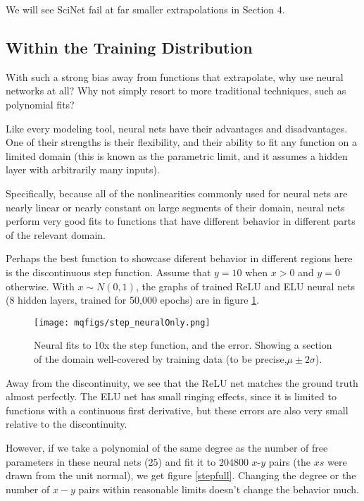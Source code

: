 \documentclass[aps,prl,preprint,groupedaddress]{revtex4-1}
\begin{document}
We will see SciNet fail at far smaller extrapolations in Section $4$.

\subsection{Within the Training Distribution}

With such a strong bias away from functions that extrapolate, why use neural networks at all? Why not simply resort to more traditional techniques, such as polynomial fits?

Like every modeling tool, neural nets have their advantages and disadvantages. One of their strengths is their flexibility, and their ability to fit any function on a limited domain (this is known as the parametric limit, and it assumes a hidden layer with arbitrarily many inputs). 

Specifically, because all of the nonlinearities commonly used for neural nets are nearly linear or nearly constant on large segments of their domain, neural nets perform very good fits to functions that have different behavior in different parts of the relevant domain.

Perhaps the best function to showcase diferent behavior in different regions here is the discontinuous step function. Assume that $y = 10$ when $x > 0$ and $y = 0$ otherwise. With $x \sim N(0, 1)$, the graphs of trained ReLU and ELU neural nets (8 hidden layers, trained for 50,000 epochs) are in figure \ref{stepneural}.

\begin{figure}[h]
   \centering
   \texttt{[image: mqfigs/step\_neuralOnly.png]}
   \caption{\label{stepneural} Neural fits to 10x the step function, and the error. Showing a section of the domain well-covered by training data (to be precise,$\mu \pm 2\sigma$).}
\end{figure}

Away from the discontinuity, we see that the ReLU net matches the ground truth almost perfectly. The ELU net has small ringing effects, since it is limited to functions with a continuous first derivative, but these errors are also very small relative to the discontinuity.

However, if we take a polynomial of the same degree as the number of free parameters in these neural nets ($25$) and fit it to $204800$ $x$-$y$ pairs (the $xs$ were drawn from the unit normal), we get figure \ref{stepfull}. Changing the degree or the number of $x-y$ pairs within reasonable limits doesn't change the behavior much.
\end{document}
